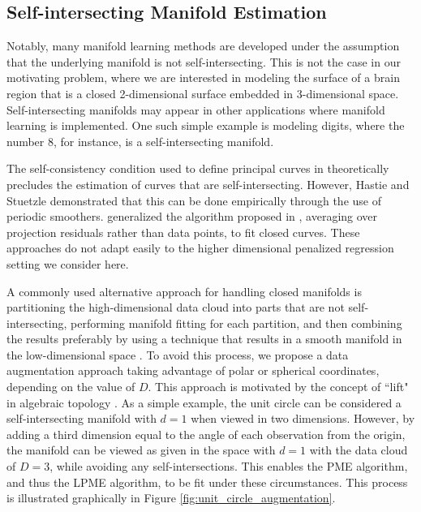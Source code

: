 \documentclass[12pt]{article}
\theoremstyle{definition}
\begin{document}
\subsection{Self-intersecting Manifold Estimation}\label{ss:selfInt}

Notably, many manifold learning methods are developed under the assumption that the underlying manifold is not self-intersecting. This is not the case in our motivating problem, where we are interested in modeling the surface of a brain region that is a closed 2-dimensional surface embedded in 3-dimensional space. Self-intersecting manifolds may appear in other applications where manifold learning is implemented. One such simple example is modeling digits, where the number 8, for instance, is a self-intersecting manifold.

The self-consistency condition used to define principal curves in \cite{hastiePrincipalCurves1989} theoretically precludes the estimation of curves that are self-intersecting. However, Hastie and Stuetzle demonstrated that this can be done empirically through the use of periodic smoothers. \cite{banfieldIceFloeIdentification1992} generalized the algorithm proposed in \cite{hastiePrincipalCurves1989}, averaging over projection residuals rather than data points, to fit closed curves. These approaches do not adapt easily to the higher dimensional penalized regression setting we consider here.

A commonly used alternative approach for handling closed manifolds is partitioning the high-dimensional data cloud into parts that are not self-intersecting, performing manifold fitting for each partition, and then combining the results preferably by using a technique that results in a smooth manifold in the low-dimensional space \citep[e.g.][]{mengPrincipalManifoldEstimation2021}. To avoid this process, we propose a data augmentation approach taking advantage of polar or spherical coordinates, depending on the value of $D$. This approach is motivated by the concept of ``lift" in algebraic topology \citep[sec. 1.1]{hatcher2002algebraic}. As a simple example, the unit circle can be considered a self-intersecting manifold with $d = 1$ when viewed in two dimensions. However, by adding a third dimension equal to the angle of each observation from the origin, the manifold can be viewed as given in the space with $d = 1$ with the data cloud of $D = 3$, while avoiding any self-intersections. This enables the PME algorithm, and thus the LPME algorithm, to be fit under these circumstances. This process is illustrated graphically in Figure \ref{fig:unit_circle_augmentation}.
\end{document}
